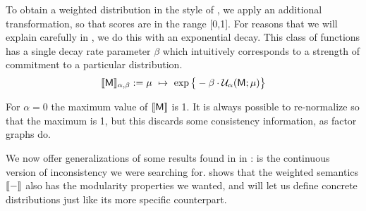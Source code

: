 \documentclass{article}
\newcommand{\sfM}{\mathsf M}
\numberwithin{equation}{section}
\begin{document}
\begin{notfocus}
	To obtain a weighted distribution in the style of \parencite{halpern2015weighted}, we apply an additional transformation, so that scores are in the range [0,1].
	For reasons that we will explain carefully in , we do this with an exponential decay. 
	This class of functions has a single decay rate parameter $\beta$ which intuitively corresponds to a strength of commitment to a particular distribution.
	\begin{equation}
		\bbr{\sfM}_{\alpha,\beta} := \mu~\mapsto~\exp \big\{ -\beta \cdot \mathcal U_\alpha(\sfM; \mu) \big\} \label{eqn:weighted-semantics}
	\end{equation}
	
	For $\alpha = 0$ the maximum value of $\bbr{\sfM}$ is 1. It is always possible to re-normalize so that the maximum is 1, but this discards some consistency information, as factor graphs do.
	


	We now offer generalizations of some results found in in :  is the continuous version of inconsistency we were searching for.  shows that the weighted semantics $\llbracket-\rrbracket$ also has the modularity properties we wanted, and  will let us define concrete distributions just like its more specific counterpart.
	

\end{notfocus}
\end{document}

